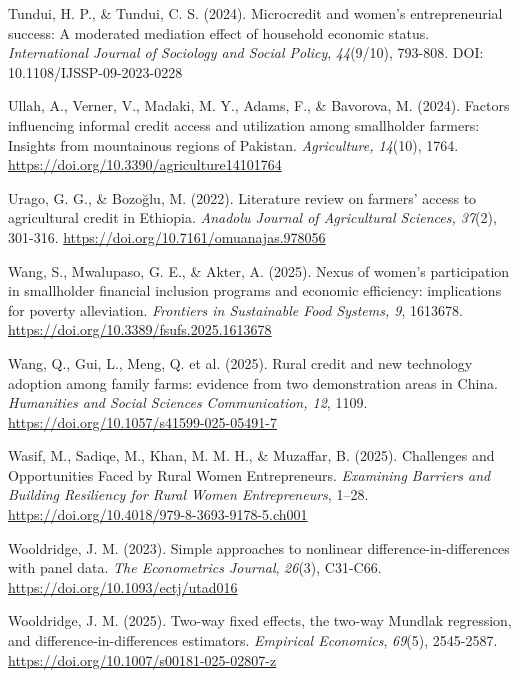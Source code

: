 ﻿\documentclass[sn-mathphys-num]{sn-jnl}
\newcommand{\hl}[1]{#1}
\begin{document}
\hl{Tundui, H. P., \& Tundui, C. S. (2024). Microcredit and women's
entrepreneurial success: A moderated mediation effect of household
economic status. \emph{International Journal of Sociology and Social
Policy}, \emph{44}(9/10), 793-808.
DOI: 10.1108/IJSSP-09-2023-0228}

\hl{Ullah, A., Verner, V., Madaki, M. Y., Adams, F., \& Bavorova, M.
(2024). Factors influencing informal credit access and utilization among
smallholder farmers: Insights from mountainous regions of Pakistan.
\emph{Agriculture, 14}(10), 1764.
\mbox{\url{https://doi.org/10.3390/agriculture14101764}}}

\hl{Urago, G. G., \& Bozoğlu, M. (2022). Literature review on farmers'
access to agricultural credit in Ethiopia. \emph{Anadolu Journal of
Agricultural Sciences, 37}(2), 301-316.}
\href{https://doi.org/10.7161/omuanajas.978056}{\hl{https://doi.org/10.7161/omuanajas.978056}}

\hl{Wang, S., Mwalupaso, G. E., \& Akter, A. (2025). Nexus of women's
participation in smallholder financial inclusion programs and economic
efficiency: implications for poverty alleviation. \emph{Frontiers in
Sustainable Food Systems, 9}, 1613678.
\mbox{\url{https://doi.org/10.3389/fsufs.2025.1613678}}}

\hl{Wang, Q., Gui, L., Meng, Q. et al. (2025). Rural credit and new
technology adoption among family farms: evidence from two demonstration
areas in China. \emph{Humanities and Social Sciences Communication, 12},
1109.}
\href{https://doi.org/10.1057/s41599-025-05491-7}{\hl{https://doi.org/10.1057/s41599-025-05491-7}}

\hl{Wasif, M., Sadiqe, M., Khan, M. M. H., \& Muzaffar, B. (2025).
Challenges and Opportunities Faced by Rural Women Entrepreneurs.
\emph{Examining Barriers and Building Resiliency for Rural Women
Entrepreneurs}, 1--28.
\mbox{\url{https://doi.org/10.4018/979-8-3693-9178-5.ch001}}}

\hl{Wooldridge, J. M. (2023). Simple approaches to nonlinear
difference-in-differences with panel data. \emph{The Econometrics
Journal}, \emph{26}(3), C31-C66.}
\href{https://doi.org/10.1093/ectj/utad016}{\hl{https://doi.org/10.1093/ectj/utad016}}

\hl{Wooldridge, J. M. (2025). Two-way fixed effects, the two-way Mundlak
regression, and difference-in-differences estimators. \emph{Empirical
Economics}, \emph{69}(5), 2545-2587.}
\href{https://doi.org/10.1007/s00181-025-02807-z}{\hl{https://doi.org/10.1007/s00181-025-02807-z}}
\end{document}
